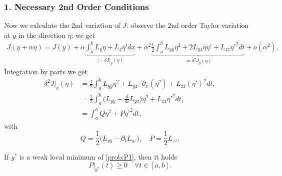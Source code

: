 \subsubsection{1. Necessary 2nd Order Conditions}
Now we calculate the 2nd variation of $J$: observe the 2nd order Taylor variation at $y$ in the direction $\eta$:
we get
\begin{align*}
	J(y + \alpha \eta) = J(y) + 
	\alpha 
	\underbrace{\int_a^b L_y \eta + L_z \eta' dx}_{:= \delta J|_y(\eta)} 
	+ \alpha^2
	\underbrace{\frac{1}{2} \int_a^b L_{yy} \eta^2 + 2 L_{yz}\eta \eta' + L_{zz} \eta'^2 dt}_{:= \delta^2 J_y(\eta)} 
	+ o(\alpha^2). 
\end{align*}
Integration by parts we get
\begin{equation}
\begin{aligned}
	\delta^2 J|_y(\eta) 
	& = \frac{1}{2} \int_a^b   L_{yy} \eta^2  
	+ L_{yz} \cdot \partial_x(\eta^2) + L_{zz} (\eta')^2 dt,\\
	& = \frac{1}{2} \int_a^b \bigg(L_{yy} -  \frac{d}{dt} L_{yz} \bigg) \eta^2 
	+ L_{zz} \eta'^2 dt,\\
	& = \int_a^b Q \eta^2 + P \eta'^2dt,
\end{aligned}
\end{equation}
with
\begin{equation*}
	Q = \frac{1}{2}\bigg(L_{yy} - \partial_t L_{yz} \bigg), \quad P = \frac{1}{2} L_{zz}. 
\end{equation*}
\begin{theorem}
	If $y^*$ is a weak local minimum of \eqref{prob:P1}, then it holds
	\begin{equation}
		P|_{y^*}(t) \ge 0  \quad \forall t \in [a, b].
	\end{equation}
\end{theorem}
